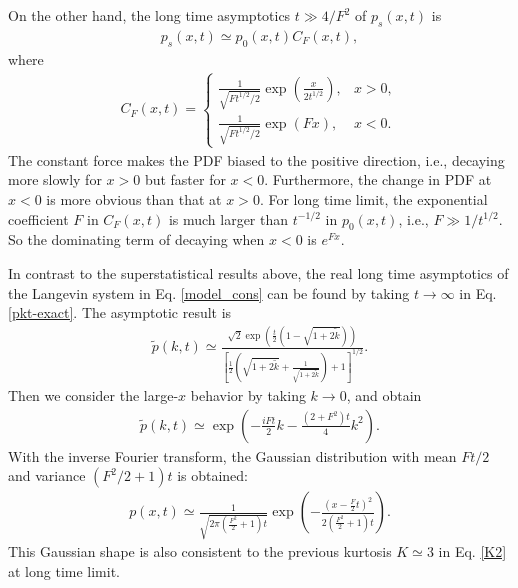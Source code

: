 \documentclass[aps,pre,twocolumn,groupedaddress,longbibliography]{revtex4-2}
\begin{document}
On the other hand, the long time asymptotics $t\gg 4/F^2$ of $p_s(x,t)$ is
\begin{equation}\label{psxt-LT}
\begin{split}
p_s(x,t)\simeq p_0(x,t)C_F(x,t),
\end{split}
\end{equation}
where
\begin{equation}
  \begin{split}
    C_F(x,t)=\left\{
    \begin{array}{ll}
    \frac{1}{\sqrt{Ft^{1/2}/2}}\exp\left(\frac{x}{2t^{1/2}}\right),  &  x>0,  \\[5pt]
    \frac{1}{\sqrt{Ft^{1/2}/2}}\exp\left(Fx\right),  & x<0.
    \end{array}\right.
  \end{split}
\end{equation}
The constant force makes the PDF biased to the positive direction, i.e., decaying more slowly for $x>0$ but faster for $x<0$. Furthermore, the change in PDF at $x<0$ is more obvious than that at $x>0$. For long time limit, the exponential coefficient $F$ in $C_F(x,t)$ is much larger than $t^{-1/2}$ in $p_0(x,t)$, i.e., $F\gg 1/t^{1/2}$. So the dominating term of decaying when $x<0$ is $e^{Fx}$.


In contrast to the superstatistical results above, the real long time asymptotics of the Langevin system in Eq. \eqref{model_cons} can be found by taking $t\rightarrow \infty$ in Eq. \eqref{pkt-exact}. The asymptotic result is
\begin{equation}
\begin{split}
\tilde{p}(k,t)\simeq \frac{\sqrt{2}\exp\left(\frac{t}{2}(1-\sqrt{1+2\tilde{k}})\right)}
{\left[\frac{1}{2}\left(\sqrt{1+2\tilde{k}}+\frac{1}{\sqrt{1+2\tilde{k}}}\right)+1\right]^{1/2}}.
\end{split}
\end{equation}
Then we consider the large-$x$ behavior by taking $k\rightarrow 0$, and obtain
\begin{equation}
\begin{split}
\tilde{p}(k,t)\simeq \exp\left(-\frac{iFt}{2}k -\frac{(2+F^2)t}{4}k^2\right).
\end{split}
\end{equation}
With the inverse Fourier transform, the Gaussian distribution with mean $Ft/2$ and variance $(F^2/2+1)t$ is obtained:
\begin{equation}\label{long}
\begin{split}
p(x,t)\simeq \frac{1}{\sqrt{2\pi\left(\frac{F^2}{2}+1\right)t}}
\exp\left(-\frac{\left(x-\frac{F}{2}t\right)^2}{2\left(\frac{F^2}{2}+1\right)t}\right).
\end{split}
\end{equation}
This Gaussian shape is also consistent to the previous kurtosis $K\simeq3$ in Eq. \eqref{K2} at long time limit.
\end{document}
